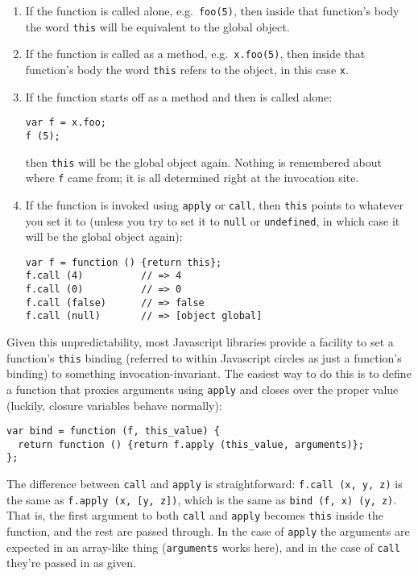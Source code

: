\documentclass{article}
\begin{document}
\begin{enumerate}
\item If the function is called alone, e.g.~\verb|foo(5)|, then inside that function's body the word \verb|this| will be equivalent to the global object.
\item If the function is called as a method, e.g.~\verb|x.foo(5)|, then inside that function's body the word \verb|this| refers to the object, in this case \verb|x|.
\item If the function starts off as a method and then is called alone:

\begin{verbatim}
var f = x.foo;
f (5);
\end{verbatim}

        then \verb|this| will be the global object again. Nothing is remembered about where \verb|f| came from; it is all determined right at the invocation site. \label{itm:forget}

\item If the function is invoked using \verb|apply| or \verb|call|, then \verb|this| points to whatever you set it to (unless you try to set it to \verb|null| or \verb|undefined|, in
        which case it will be the global object again):

\begin{verbatim}
var f = function () {return this};
f.call (4)          // => 4
f.call (0)          // => 0
f.call (false)      // => false
f.call (null)       // => [object global]
\end{verbatim}
\end{enumerate}

    Given this unpredictability, most Javascript libraries provide a facility to set a function's \verb|this| binding (referred to within Javascript circles as just a function's binding)
    to something invocation-invariant. The easiest way to do this is to define a function that proxies arguments using \verb|apply| and closes over the proper value (luckily, closure
    variables behave normally):

\begin{verbatim}
var bind = function (f, this_value) {
  return function () {return f.apply (this_value, arguments)};
};
\end{verbatim}

    The difference between \verb|call| and \verb|apply| is straightforward: \verb|f.call (x, y, z)| is the same as \verb|f.apply (x, [y, z])|, which is the same as
    \verb|bind (f, x) (y, z)|. That is, the first argument to both \verb|call| and \verb|apply| becomes \verb|this| inside the function, and the rest are passed through. In the case of
    \verb|apply| the arguments are expected in an array-like thing (\verb|arguments| works here), and in the case of \verb|call| they're passed in as given.
\end{document}
